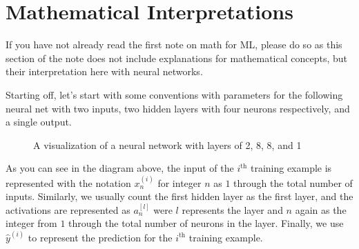 \documentclass[../../../main.tex]{subfiles}
\begin{document}
\section{Mathematical Interpretations}

If you have not already read the first note on math for ML,
please do so as this section of the note does not include explanations
for mathematical concepts, but their interpretation here with
neural networks.

Starting off, let's start with some conventions with parameters for
the following neural net with two inputs, two hidden layers with
four neurons respectively, and a single output.

\begin{figure}[H]
\centering
{}
\caption{A visualization of a neural network with layers of 2, 8,
         8, and 1}
\end{figure}

As you can see in the diagram above, the input of the $i^\text{th}$
training example is represented with the notation $x_n^{(i)}$ for
integer $n$ as $1$ through the total number of inputs. Similarly,
we usually count the first hidden layer as the first layer, and the
activations are represented as $a_n^{[l]}$ were $l$ represents the
layer and $n$ again as the integer from $1$ through the total number
of neurons in the layer. Finally, we use $\hat{y}^{(i)}$ to
represent the prediction for the $i^\text{th}$ training example.
\end{document}
